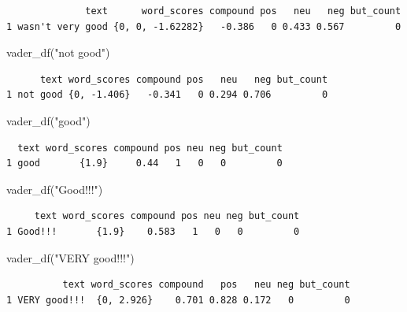 \documentclass[
  letterpaper,
  DIV=11,
  numbers=noendperiod]{scrreprt}
\newenvironment{Shaded}{\begin{snugshade}}{\end{snugshade}}
\newcommand{\FunctionTok}[1]{\textcolor[rgb]{0.28,0.35,0.67}{#1}}
\newcommand{\NormalTok}[1]{\textcolor[rgb]{0.00,0.23,0.31}{#1}}
\newcommand{\StringTok}[1]{\textcolor[rgb]{0.13,0.47,0.30}{#1}}
\begin{document}
\begin{verbatim}
              text      word_scores compound pos   neu   neg but_count
1 wasn't very good {0, 0, -1.62282}   -0.386   0 0.433 0.567         0
\end{verbatim}

\begin{Shaded}
\begin{Highlighting}[]
\FunctionTok{vader\_df}\NormalTok{(}\StringTok{"not good"}\NormalTok{)}
\end{Highlighting}
\end{Shaded}

\begin{verbatim}
      text word_scores compound pos   neu   neg but_count
1 not good {0, -1.406}   -0.341   0 0.294 0.706         0
\end{verbatim}

\begin{Shaded}
\begin{Highlighting}[]
\FunctionTok{vader\_df}\NormalTok{(}\StringTok{"good"}\NormalTok{)}
\end{Highlighting}
\end{Shaded}

\begin{verbatim}
  text word_scores compound pos neu neg but_count
1 good       {1.9}     0.44   1   0   0         0
\end{verbatim}

\begin{Shaded}
\begin{Highlighting}[]
\FunctionTok{vader\_df}\NormalTok{(}\StringTok{"Good!!!"}\NormalTok{)}
\end{Highlighting}
\end{Shaded}

\begin{verbatim}
     text word_scores compound pos neu neg but_count
1 Good!!!       {1.9}    0.583   1   0   0         0
\end{verbatim}

\begin{Shaded}
\begin{Highlighting}[]
\FunctionTok{vader\_df}\NormalTok{(}\StringTok{"VERY good!!!"}\NormalTok{)}
\end{Highlighting}
\end{Shaded}

\begin{verbatim}
          text word_scores compound   pos   neu neg but_count
1 VERY good!!!  {0, 2.926}    0.701 0.828 0.172   0         0
\end{verbatim}
\end{document}
